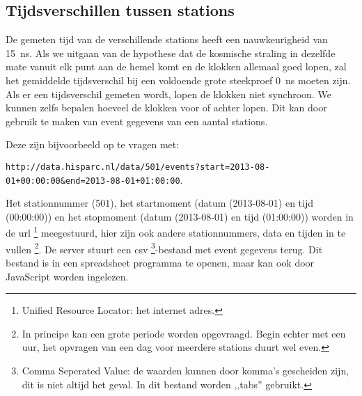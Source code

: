 \subsection{Tijdsverschillen tussen stations}

De gemeten tijd van de verschillende stations heeft een nauwkeurigheid
van \SI{15}{\nano\second}. Als we uitgaan van de hypothese dat de
kosmische straling in dezelfde mate vanuit elk punt aan de hemel
komt en de klokken allemaal goed lopen, zal het gemiddelde tijdsverschil
bij een voldoende grote steekproef \SI{0}{\nano\second} moeten zijn.
Als er een tijdsverschil gemeten wordt, lopen de klokken niet synchroon.
We kunnen zelfs bepalen hoeveel de klokken voor of achter lopen. Dit
kan door gebruik te maken van event gegevens van een aantal stations. 

Deze zijn bijvoorbeeld op te vragen met:

\texttt{\small{http://data.hisparc.nl/data/501/events?start=2013-08-01+00:00:00\&end=2013-08-01+01:00:00}}. 

Het stationnummer (501), het startmoment (datum (2013-08-01) en tijd
(00:00:00)) en het stopmoment (datum (2013-08-01) en tijd (01:00:00))
worden in de url%
\footnote{Unified Resource Locator: het internet adres.%
} meegestuurd, hier zijn ook andere stationnummers, data en tijden
in te vullen%
\footnote{In principe kan een grote periode worden opgevraagd. Begin echter
met een uur, het opvragen van een dag voor meerdere stations duurt
wel even.%
}. De server stuurt een csv%
\footnote{Comma Seperated Value: de waarden kunnen door komma's gescheiden zijn,
dit is niet altijd het geval. In dit bestand worden ,,tabs'' gebruikt.%
}-bestand met event gegevens terug. Dit bestand is in een spreadsheet
programma te openen, maar kan ook door JavaScript worden ingelezen.

